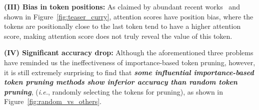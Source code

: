 \noindent \textbf{(III) Bias in token positions:} As claimed by abundant recent works~\citep{endo2024feather, zhang2024cls} and shown in Figure~\ref{fig:teaser_curry}, attention scores have position bias, where the tokens are positionally close to the last token tend to have a higher attention score, making attention score does not truly reveal the value of this token.


\noindent \textbf{(IV) Significant accuracy drop:} Although the aforementioned three problems have reminded us the ineffectiveness of importance-based token pruning, however, it is still extremely surprising to find that \textbf{\emph{{some influential importance-based token pruning methods show inferior accuracy than random token pruning}}}, (\emph{i.e.}, randomly selecting the tokens for pruning), as shown in Figure~\ref{fig:random_vs_others}. 








